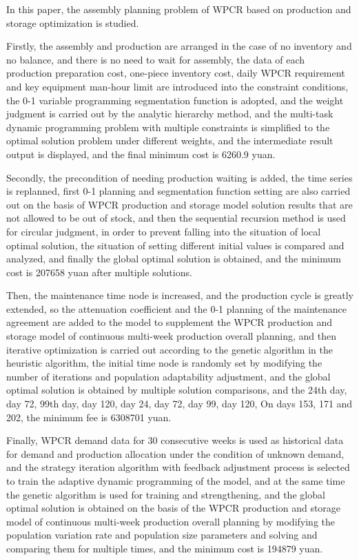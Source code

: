 \begin{abstractEn}

  In this paper, the assembly planning problem of WPCR based on production and storage optimization is studied.

  Firstly, the assembly and production are arranged in the case of no inventory and no balance,
  and there is no need to wait for assembly, the data of each production preparation cost, 
  one-piece inventory cost, 
  daily WPCR requirement and key equipment man-hour limit are introduced into the constraint conditions, 
  the 0-1 variable programming segmentation function is adopted, 
  and the weight judgment is carried out by the analytic hierarchy method, 
  and the multi-task dynamic programming problem with multiple constraints is simplified to the optimal 
  solution problem under different weights, and the intermediate result output is displayed, 
  and the final minimum cost is 6260.9 yuan.

  Secondly, the precondition of needing production waiting is added, the time series is replanned,
  first 0-1 planning and segmentation function setting are also carried out on the basis of WPCR 
  production and storage model solution results that are not allowed to be out of stock, 
  and then the sequential recursion method is used for circular judgment, in order to prevent falling 
  into the situation of local optimal solution, the situation of setting different initial values is 
  compared and analyzed, and finally the global optimal solution is obtained, and the minimum cost is 
  207658 yuan after multiple solutions.

  Then, the maintenance time node is increased, and the production cycle is greatly extended, 
  so the attenuation coefficient and the 0-1 planning of the maintenance agreement are added to the 
  model to supplement the WPCR production and storage model of continuous multi-week production 
  overall planning, and then iterative optimization is carried out according to the genetic algorithm 
  in the heuristic algorithm, the initial time node is randomly set by modifying the number of iterations
  and population adaptability adjustment, and the global optimal solution is obtained by multiple solution 
  comparisons, and the 24th day, day 72, 99th day, day 120, day 24, day 72, day 99, day 120, On days 153,
  171 and 202, the minimum fee is 6308701 yuan.

  Finally, WPCR demand data for 30 consecutive weeks is used as historical data for demand and production
  allocation under the condition of unknown demand, and the strategy iteration algorithm with feedback
  adjustment process is selected to train the adaptive dynamic programming of the model, and at the same 
  time the genetic algorithm is used for training and strengthening, and the global optimal solution is 
  obtained on the basis of the WPCR production and storage model of continuous multi-week production overall
  planning by modifying the population variation rate and population size parameters and solving and 
  comparing them for multiple times, and the minimum cost is 194879 yuan.

\end{abstractEn}
  